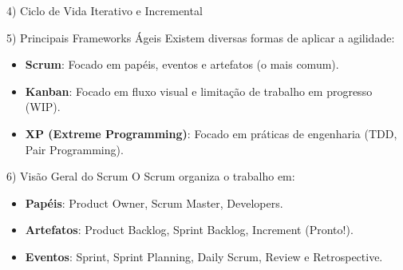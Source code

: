 \documentclass[aspectratio=169]{beamer}
\begin{document}
\begin{frame}{4) Ciclo de Vida Iterativo e Incremental}
  \centering
\end{frame}

\begin{frame}{5) Principais Frameworks Ágeis}
  Existem diversas formas de aplicar a agilidade:
  \begin{itemize}
    \item \textbf{Scrum}: Focado em papéis, eventos e artefatos (o mais comum).
    \item \textbf{Kanban}: Focado em fluxo visual e limitação de trabalho em progresso (WIP).
    \item \textbf{XP (Extreme Programming)}: Focado em práticas de engenharia (TDD, Pair Programming).
  \end{itemize}
\end{frame}

\begin{frame}{6) Visão Geral do Scrum}
  O Scrum organiza o trabalho em:
  \begin{itemize}
    \item \textbf{Papéis}: Product Owner, Scrum Master, Developers.
    \item \textbf{Artefatos}: Product Backlog, Sprint Backlog, Increment (Pronto!).
    \item \textbf{Eventos}: Sprint, Sprint Planning, Daily Scrum, Review e Retrospective.
  \end{itemize}
\end{frame}
\end{document}
